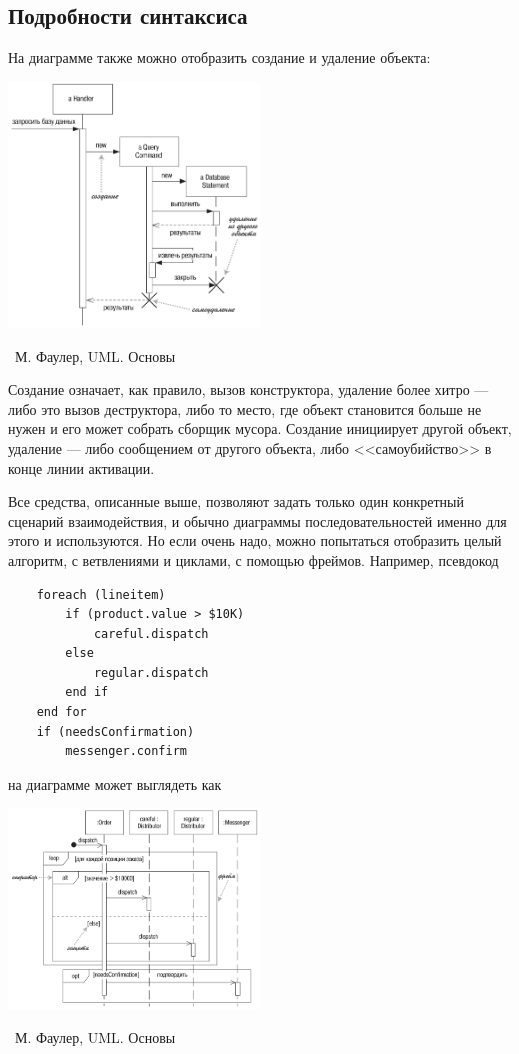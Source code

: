 \documentclass[a5paper]{article}
\newcommand{\attribution}[1] {
	\vspace{-5mm}\begin{flushright}\begin{scriptsize}%
	{\textcopyright\, #1}\end{scriptsize}\end{flushright}
}
\begin{document}
\subsection{Подробности синтаксиса}

На диаграмме также можно отобразить создание и удаление объекта:

\begin{center}
	\includegraphics[width=0.5\textwidth]{sequenceDiagramCreationAndDeletion.png}
	\attribution{М. Фаулер, UML. Основы}
\end{center}

Создание означает, как правило, вызов конструктора, удаление более хитро --- либо это вызов деструктора, либо то место, где объект становится больше не нужен и его может собрать сборщик мусора. Создание инициирует другой объект, удаление --- либо сообщением от другого объекта, либо <<самоубийство>> в конце линии активации.

Все средства, описанные выше, позволяют задать только один конкретный сценарий взаимодействия, и обычно диаграммы последовательностей именно для этого и используются. Но если очень надо, можно попытаться отобразить целый алгоритм, с ветвлениями и циклами, с помощью фреймов. Например, псевдокод

\begin{verbatim}
    foreach (lineitem)
        if (product.value > $10K)
            careful.dispatch
        else
            regular.dispatch
        end if
    end for
    if (needsConfirmation) 
        messenger.confirm
\end{verbatim}

на диаграмме может выглядеть как

\begin{center}
	\includegraphics[width=0.5\textwidth]{sequenceDiagramFrames.png}
	\attribution{М. Фаулер, UML. Основы}
\end{center}
\end{document}
